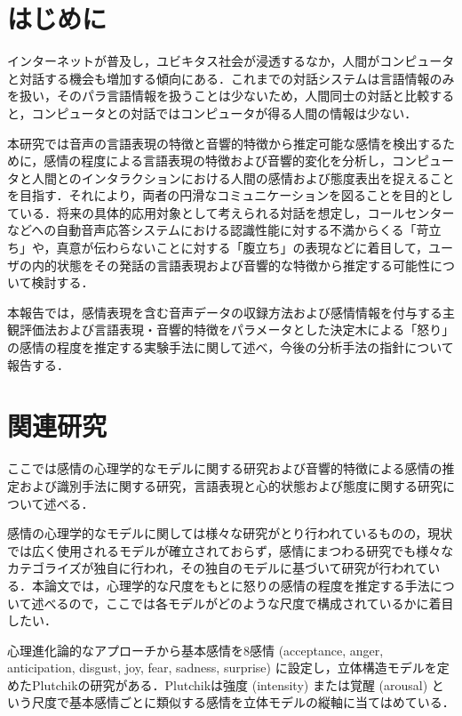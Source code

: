 \documentclass[japanese]{jnlp_1.3c}
\begin{document}
\maketitle





\section{はじめに}

インターネットが普及し，ユビキタス社会が浸透するなか，人間がコンピュータと対話する機会も増加する傾向にある．これまでの対話システムは言語情報のみを扱い，そのパラ言語情報を扱うことは少ないため，人間同士の対話と比較すると，コンピュータとの対話ではコンピュータが得る人間の情報は少ない．

本研究では音声の言語表現の特徴と音響的特徴から推定可能な感情を検出するために，感情の程度による言語表現の特徴および音響的変化を分析し，コンピュータと人間とのインタラクションにおける人間の感情および態度表出を捉えることを目指す．それにより，両者の円滑なコミュニケーションを図ることを目的としている．将来の具体的応用対象として考えられる対話を想定し，コールセンターなどへの自動音声応答システムにおける認識性能に対する不満からくる「苛立ち」や，真意が伝わらないことに対する「腹立ち」の表現などに着目して，ユーザの内的状態をその発話の言語表現および音響的な特徴から推定する可能性について検討する．

本報告では，感情表現を含む音声データの収録方法および感情情報を付与する主観評価法および言語表現・音響的特徴をパラメータとした決定木による「怒り」の感情の程度を推定する実験手法に関して述べ，今後の分析手法の指針について報告する．

\section{関連研究}
ここでは感情の心理学的なモデルに関する研究および音響的特徴による感情の推定および識別手法に関する研究，言語表現と心的状態および態度に関する研究について述べる．

感情の心理学的なモデルに関しては様々な研究がとり行われているものの，現状では広く使用されるモデルが確立されておらず，感情にまつわる研究でも様々なカテゴライズが独自に行われ，その独自のモデルに基づいて研究が行われている．本論文では，心理学的な尺度をもとに怒りの感情の程度を推定する手法について述べるので，ここでは各モデルがどのような尺度で構成されているかに着目したい．

心理進化論的なアプローチから基本感情を8感情 (acceptance, anger, anticipation, disgust, joy, fear, sadness, surprise) に設定し，立体構造モデルを定めたPlutchikの研究がある\cite{plutchik1980}．Plutchikは強度 (intensity) または覚醒 (arousal) という尺度で基本感情ごとに類似する感情を立体モデルの縦軸に当てはめている．
\end{document}
